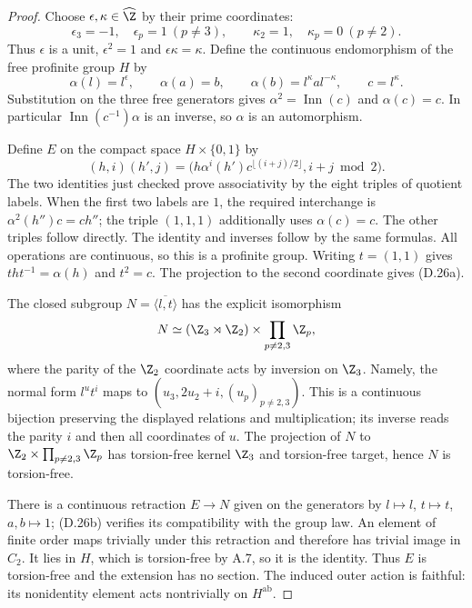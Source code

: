 \begin{proof}
Choose $\epsilon,\kappa\in\widehat\Z$ by their prime
coordinates:
\[
 \epsilon_3=-1,\quad\epsilon_p=1\ (p\ne3),\qquad
 \kappa_2=1,\quad\kappa_p=0\ (p\ne2).
\]
Thus $\epsilon$ is a unit, $\epsilon^2=1$ and
$\epsilon\kappa=\kappa$. Define the continuous endomorphism
of the free profinite group $H$ by
\[
 \alpha(l)=l^\epsilon,\qquad
 \alpha(a)=b,\qquad
 \alpha(b)=l^\kappa a l^{-\kappa},\qquad c=l^\kappa.
                                                               \tag{D.26b}
\]
Substitution on the three free generators gives
$\alpha^2=\operatorname{Inn}(c)$ and $\alpha(c)=c$.
In particular $\operatorname{Inn}(c^{-1})\alpha$ is an
inverse, so $\alpha$ is an automorphism.

Define $E$ on the compact space $H\times\{0,1\}$ by
\[
 (h,i)(h',j)=
 \bigl(h\alpha^i(h')c^{\lfloor(i+j)/2\rfloor},
             i+j\bmod2\bigr).
                                                               \tag{D.26c}
\]
The two identities just checked prove associativity by
the eight triples of quotient labels. When the first two
labels are $1$, the required interchange is
$\alpha^2(h'')c=ch''$; the triple $(1,1,1)$ additionally
uses $\alpha(c)=c$. The other triples follow directly.
The identity and inverses follow by the same formulas.
All operations are continuous, so this is a profinite group.
Writing $t=(1,1)$ gives $tht^{-1}=\alpha(h)$ and $t^2=c$.
The projection to the second coordinate gives (D.26a).

The closed subgroup $N=\overline{\langle l,t\rangle}$
has the explicit isomorphism
\[
 N\simeq (\Z_3\rtimes\Z_2)
          \times\prod_{p\ne2,3}\Z_p,
\]
where the parity of the $\Z_2$ coordinate acts by inversion
on $\Z_3$. Namely, the normal form $l^u t^i$ maps to
$(u_3,2u_2+i,(u_p)_{p\ne2,3})$.
This is a continuous bijection preserving the displayed
relations and multiplication; its inverse reads the parity
$i$ and then all coordinates of $u$.
The projection of $N$ to
$\Z_2\times\prod_{p\ne2,3}\Z_p$ has torsion-free kernel
$\Z_3$ and torsion-free target, hence $N$ is torsion-free.

There is a continuous retraction $E\to N$ given on the
generators by $l\mapsto l$, $t\mapsto t$, $a,b\mapsto1$;
(D.26b) verifies its compatibility with the group law.
An element of finite order maps trivially under this
retraction and therefore has trivial image in $C_2$.
It lies in $H$, which is torsion-free by A.7, so it is
the identity. Thus $E$ is torsion-free and the extension
has no section. The induced outer action is faithful:
its nonidentity element acts nontrivially on $H^{\mathrm{ab}}$.


\end{proof}
